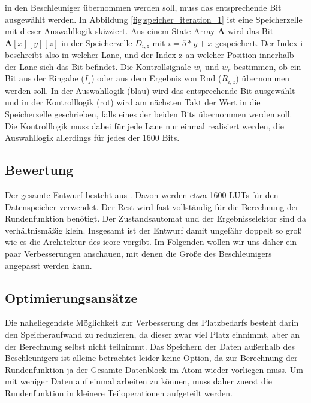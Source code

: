 in den Beschleuniger übernommen werden soll, muss das entsprechende Bit ausgewählt werden. In Abbildung \ref{fig:speicher_iteration_1} ist eine Speicherzelle
mit dieser Auswahllogik skizziert. Aus einem State Array $\textbf{A}$ wird das Bit $\textbf{A}[x][y][z]$ in der Speicherzelle $D_{i,z}$ mit $i = 5 * y + x$ gespeichert.
Der Index i beschreibt also in welcher Lane, und der Index z an welcher Position innerhalb der Lane sich das Bit befindet. Die Kontrollsignale $w_i$ und $w_r$ bestimmen,
ob ein Bit aus der Eingabe ($I_z$) oder aus dem Ergebnis von Rnd ($R_{i,z}$) übernommen werden soll. In der Auswahllogik (blau) wird das entsprechende Bit ausgewählt und in der
Kontrolllogik (rot) wird am nächsten Takt der Wert in die Speicherzelle geschrieben, falls eines der beiden Bits übernommen werden soll.
Die Kontrolllogik muss dabei für jede Lane nur einmal realisiert werden, die Auswahllogik allerdings für jedes der 1600 Bits. 

\subsection{Bewertung}
Der gesamte Entwurf besteht aus . Davon werden etwa 1600 LUTs für den Datenspeicher verwendet.
Der Rest wird fast vollständig für die Berechnung der Rundenfunktion benötigt. Der Zustandsautomat und der Ergebnisselektor sind da verhältnismäßig klein.
Insgesamt ist der Entwurf damit ungefähr doppelt so groß wie es die Architektur des icore vorgibt. Im Folgenden wollen wir uns daher ein paar Verbesserungen anschauen,
mit denen die Größe des Beschleunigers angepasst werden kann.

\subsection{Optimierungsansätze}
Die naheliegendste Möglichkeit zur Verbesserung des Platzbedarfs besteht darin den Speicheraufwand zu reduzieren, da dieser zwar viel Platz einnimmt,
aber an der Berechnung selbst nicht teilnimmt. Das Speichern der Daten außerhalb des Beschleunigers ist alleine betrachtet leider keine Option, da zur Berechnung der Rundenfunktion
ja der Gesamte Datenblock im Atom wieder vorliegen muss. Um mit weniger Daten auf einmal arbeiten zu können, muss daher zuerst die Rundenfunktion in kleinere
Teiloperationen aufgeteilt werden.

